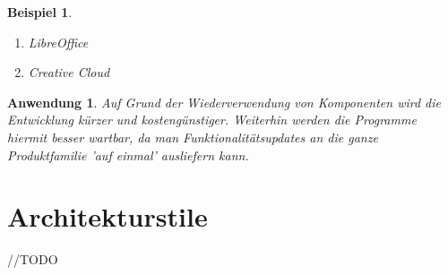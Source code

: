 \documentclass[a4paper]{article}
\theoremstyle{break}
\newtheorem{ex}{Beispiel}[section]
\newtheorem{why}{Anwendung}[section]
\begin{document}
\begin{ex}
	\begin{enumerate}
		\item LibreOffice
		\item Creative Cloud
	\end{enumerate}
\end{ex}

\begin{why}
	Auf Grund der Wiederverwendung von Komponenten wird die Entwicklung kürzer und kostengünstiger. Weiterhin werden die Programme hiermit besser wartbar, da man Funktionalitätsupdates an die ganze Produktfamilie 'auf einmal' ausliefern kann.
\end{why}
\section{Architekturstile}
//TODO
\end{document}
